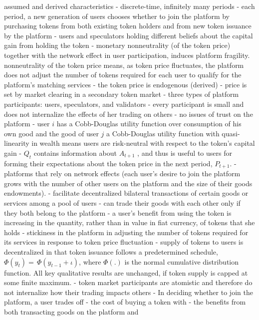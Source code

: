 assumed and derived characteristics
  - discrete-time, infinitely many periods
  - each period, a new generation of users chooses whether to join the platform by purchasing tokens from both existing token holders and from new token issuance by the platform
  - users and speculators holding different beliefs about the capital gain from holding the token
  - monetary nonneutrality (of the token price) together with the network effect in user participation, induces platform fragility. nonneutrality of the token price means, as token price fluctuates, the platform does not adjust the number of tokens required for each user to qualify for the platform's matching services
  - the token price is endogenous (derived)
  - price is set by market clearing in a secondary token market
  - three types of platform participants: users, speculators, and validators
  - every participant is small and does not internalize the effects of her trading on others
  - no issues of trust on the platform
  - user $i$ has a Cobb-Douglas utility function over consumption of his own good and the good of user $j$ a Cobb-Douglas utility function with quasi-linearity in wealth means users are risk-neutral with respect to the token's capital gain
  - $Q_t$ contains information about $A_{t+1}$ , and thus is useful to users for forming their expectations about the token price in the next period, $P_{t+1}$.
  - platforms that rely on network effects (each user's desire to join the platform grows with the number of other users on the platform and the size of their goods endowments).
  - facilitate decentralized bilateral transactions of certain goods or services among a pool of users
  - can trade their goods with each other only if they both belong to the platform
  - a user's benefit from using the token is increasing in the quantity, rather than in value in fiat currency, of tokens that she holds
  - stickiness in the platform in adjusting the number of tokens required for its services in response to token price fluctuation
  - supply of tokens to users is decentralized in that token issuance follows a predetermined schedule, $\Phi\left(y_{t}\right)=\,\Phi\left(y_{t-1}+\iota\right)$, where $\Phi\left(.\right)$ is the normal cumulative distribution function. All key qualitative results are unchanged, if token supply is capped at some finite maximum.
  - token market participants are atomistic and therefore do not internalize how their trading impacts others
  - In deciding whether to join the platform, a user trades off
    - the cost of buying a token with 
    - the benefits from both transacting goods on the platform and 

